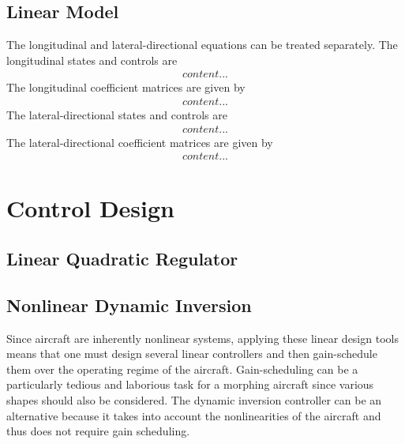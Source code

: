 \documentclass[a4paper, 12pt]{report}
\begin{document}
	\section{Linear Model}
	
	The longitudinal and lateral-directional equations can be treated separately. The longitudinal states and controls are
	\begin{align}
		content...
	\end{align}
	The longitudinal coefficient matrices are given by
	\begin{align}
		content...
	\end{align}
	The lateral-directional states and controls are
	\begin{align}
		content...
	\end{align}
	The lateral-directional coefficient matrices are given by
	\begin{align}
		content...
	\end{align}

	\chapter{Control Design}
	
	\lipsum[8]
	
	\section{Linear Quadratic Regulator}
	
	\lipsum[9]
	
	\section{Nonlinear Dynamic Inversion}
	
	Since aircraft are inherently nonlinear systems, applying these linear design tools means that one must design several linear controllers and then gain-schedule them over the operating regime of the aircraft.
	Gain-scheduling can be a particularly tedious and laborious task for a morphing aircraft since various shapes should also be considered.
	The dynamic inversion controller can be an alternative because it takes into account the nonlinearities of the aircraft and thus does not require gain scheduling.
	
	\printbibliography
	
\end{document}
